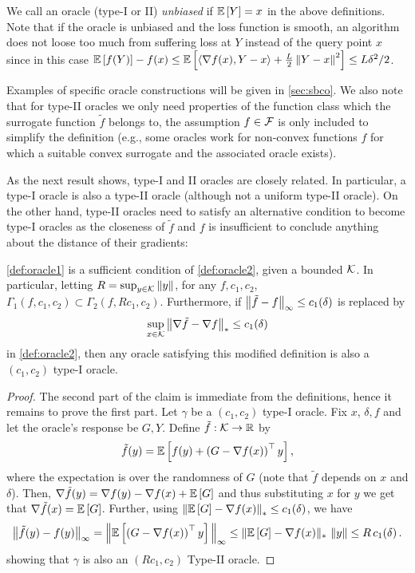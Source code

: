 We call an oracle (type-I or II)  \emph{unbiased} if $\mathbb{E}\left[Y\right]=x$ in the above definitions. Note that if the oracle is unbiased and the loss function is smooth,
 an algorithm does not loose too much from suffering loss at $Y$ instead of the query point $x$
 since in this case $\mathbb{E}\left[f(Y)\right]-f(x) \le \mathbb{E}\left[\langle \nabla f(x), Y-x \rangle+\tfrac{L}{2}\left\|Y-x\right\|^2\right] \le L\delta^2/2$.

Examples of specific oracle constructions will be given in  \cref{sec:sbco}. We also note that for type-II oracles we only need properties of the function class which the surrogate function $\tilde{f}$ belongs to, the assumption $f \in \mathcal{F}$ is only included to simplify the definition (e.g., some oracles work for non-convex functions $f$ for which a suitable convex surrogate and the associated oracle exists).

As the next result shows, type-I and II oracles are closely related.
In particular, a type-I oracle is also a type-II oracle (although not a uniform type-II oracle). On the other hand, type-II oracles need to satisfy an alternative condition to become type-I oracles as the closeness of $\tilde{f}$ and $f$ is insufficient to conclude anything about the distance of their gradients:
\begin{proposition}\label{thm:typered}
\cref{def:oracle1} is a sufficient condition of \cref{def:oracle2}, given a bounded $\mathcal{K}$. 
In particular, letting $R = \sup_{y \in \mathcal{K}}\left\|y\right\|$, 
for any $f,c_1,c_2$, $\Gamma_1(f,c_1,c_2) \subset \Gamma_2(f,Rc_1,c_2)$. 
Furthermore, if $\big\|\tilde{f}-f\big\|_\infty \le c_1(\delta)$ is replaced by 
\begin{align}
\label{eq:oracle2alt}
\sup_{x\in \mathcal{K}}\big\|\nabla \tilde{f}- \nabla f\big\|_* \le c_1(\delta)
\end{align}
in \cref{def:oracle2}, then any oracle satisfying this modified definition  is also a $(c_1,c_2)$ type-I oracle.
\end{proposition}

\begin{proof}
The second part of the claim is immediate from the definitions, hence it remains to prove the first part.
Let $\gamma$ be  a $(c_1,c_2)$ type-I oracle. Fix $x$, $\delta,f$ and let the oracle's response be $G,Y$. 
Define $\tilde{f}:\mathcal{K} \to \mathbb{R}$ by
\[\tilde{f}(y) =\mathbb{E}\left[ f(y)+ \left( G-\nabla f(x) \right)^\top y\right],\]
where the expectation is over the randomness of $G$ (note that $\tilde{f}$ depends on $x$ and $\delta$).
Then, $\nabla \tilde{f}(y) =  \nabla f(y)-\nabla f(x) + \mathbb{E}\left[G\right]$
and thus substituting $x$ for $y$ we get that $\nabla \tilde{f}(x) = \mathbb{E}\left[G\right]$.
Further, 
using $\left\| \mathbb{E}\left[G\right]  - \nabla f(x)  \right\|_* \le c_1(\delta) $,
we have
\begin{align*}
\big\|\tilde{f}(y)-f(y)\big\|_{\infty}
=
 \Big\| \mathbb{E}\left[\left( G-\nabla f(x) \right)^\top y\right]\Big\|_{\infty}
 \le \large\|\mathbb{E}\left[G\right]-\nabla f(x)\large\|_* \, \left\|y\right\|
 \le  R\,c_1(\delta)\,.
\end{align*}
showing that  $\gamma$ is also an $(Rc_1,c_2)$ Type-II oracle.
\end{proof}



